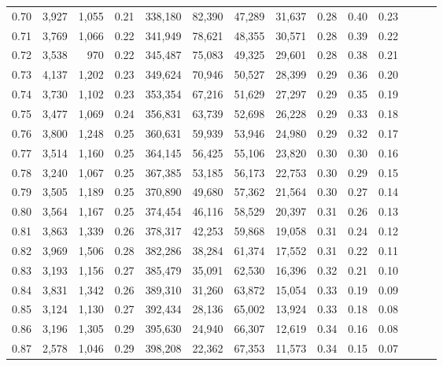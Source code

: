 \begin{tabular}{rrrrrrrrrrrrrr}
0.70 &   3,927 &  1,055 &  0.21 &  338,180 &   82,390 &  47,289 &  31,637 &  0.28 &  0.40 &      0.23 \\
0.71 &   3,769 &  1,066 &  0.22 &  341,949 &   78,621 &  48,355 &  30,571 &  0.28 &  0.39 &      0.22 \\
0.72 &   3,538 &    970 &  0.22 &  345,487 &   75,083 &  49,325 &  29,601 &  0.28 &  0.38 &      0.21 \\
0.73 &   4,137 &  1,202 &  0.23 &  349,624 &   70,946 &  50,527 &  28,399 &  0.29 &  0.36 &      0.20 \\
0.74 &   3,730 &  1,102 &  0.23 &  353,354 &   67,216 &  51,629 &  27,297 &  0.29 &  0.35 &      0.19 \\
0.75 &   3,477 &  1,069 &  0.24 &  356,831 &   63,739 &  52,698 &  26,228 &  0.29 &  0.33 &      0.18 \\
0.76 &   3,800 &  1,248 &  0.25 &  360,631 &   59,939 &  53,946 &  24,980 &  0.29 &  0.32 &      0.17 \\
0.77 &   3,514 &  1,160 &  0.25 &  364,145 &   56,425 &  55,106 &  23,820 &  0.30 &  0.30 &      0.16 \\
0.78 &   3,240 &  1,067 &  0.25 &  367,385 &   53,185 &  56,173 &  22,753 &  0.30 &  0.29 &      0.15 \\
0.79 &   3,505 &  1,189 &  0.25 &  370,890 &   49,680 &  57,362 &  21,564 &  0.30 &  0.27 &      0.14 \\
0.80 &   3,564 &  1,167 &  0.25 &  374,454 &   46,116 &  58,529 &  20,397 &  0.31 &  0.26 &      0.13 \\
0.81 &   3,863 &  1,339 &  0.26 &  378,317 &   42,253 &  59,868 &  19,058 &  0.31 &  0.24 &      0.12 \\
0.82 &   3,969 &  1,506 &  0.28 &  382,286 &   38,284 &  61,374 &  17,552 &  0.31 &  0.22 &      0.11 \\
0.83 &   3,193 &  1,156 &  0.27 &  385,479 &   35,091 &  62,530 &  16,396 &  0.32 &  0.21 &      0.10 \\
0.84 &   3,831 &  1,342 &  0.26 &  389,310 &   31,260 &  63,872 &  15,054 &  0.33 &  0.19 &      0.09 \\
0.85 &   3,124 &  1,130 &  0.27 &  392,434 &   28,136 &  65,002 &  13,924 &  0.33 &  0.18 &      0.08 \\
0.86 &   3,196 &  1,305 &  0.29 &  395,630 &   24,940 &  66,307 &  12,619 &  0.34 &  0.16 &      0.08 \\
0.87 &   2,578 &  1,046 &  0.29 &  398,208 &   22,362 &  67,353 &  11,573 &  0.34 &  0.15 &      0.07 \\

\end{tabular}
